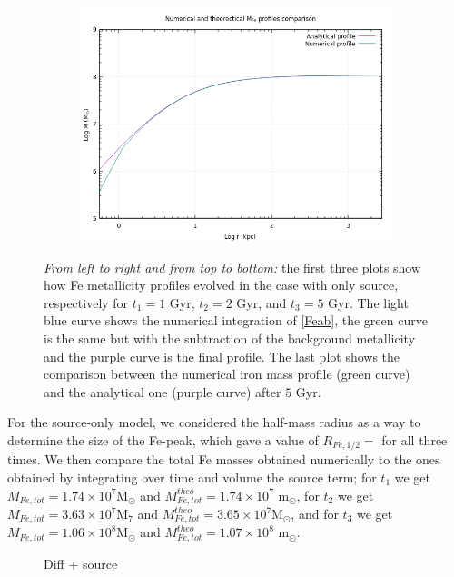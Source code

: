\documentclass{article}
\begin{document}
\begin{figure}[H]
\begin{subfigure}{0.49\textwidth}
	\end{subfigure}
	\begin{subfigure}{0.49\textwidth}
		\includegraphics[width=0.9\linewidth]{femass_comparison.png}
	\end{subfigure}
	\caption{\textit{From left to right and from top to bottom:} the first three plots show how Fe metallicity profiles evolved in the case with only source, respectively for $t_{1}=1 $ Gyr, $t_{2}=2$ Gyr, and $t_{3}=5$ Gyr. The light blue curve shows the numerical integration of \eqref{Feab}, the green curve is the same but with the subtraction of the background metallicity and the purple curve is the final profile.
	The last plot shows the comparison between the numerical iron mass profile (green curve) and the analytical one (purple curve) after $5$ Gyr.}
	\label{fig:Zsourceonly}
\end{figure}
For the source-only model, we considered the half-mass radius as a way to determine the size of the Fe-peak, which gave a value of $R_{Fe,1/2}=$ for all three times. We then compare the total Fe masses obtained numerically to the ones obtained by integrating over time and volume the source term; for $t_{1}$ we get $M_{Fe,tot}=1.74\times10^{7}$M$_{\odot}$ and $M_{Fe,tot}^{theo}=1.74\times10^{7}$ m$_{\odot}$, for $t_{2}$ we get $M_{Fe,tot}=3.63\times10^{7}$M$_{7}$ and $M_{Fe,tot}^{theo}=3.65\times 10^{7}$M$_{\odot}$, and for $t_{3}$ we get $M_{Fe,tot}=1.06\times10^{8}$M$_{\odot}$ and $M_{Fe,tot}^{theo}=1.07\times10^{8}$ m$_{\odot}$.
\begin{figure}[H]
	\begin{subfigure}{0.49\textwidth}
		
	\end{subfigure}
	\begin{subfigure}{0.49\textwidth}
		
	\end{subfigure}
	\begin{subfigure}{0.49\textwidth}
		
	\end{subfigure}
	\begin{subfigure}{0.49\textwidth}
		
	\end{subfigure}
	\caption{Diff + source}
	\label{fig:Zdiffsource}
\end{figure}
\end{document}
